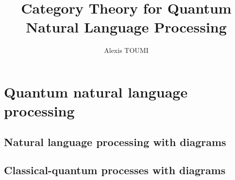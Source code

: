 

\title{Category Theory for Quantum\\
Natural Language Processing}
\author{Alexis TOUMI}

\degreedate{\today}




%
% 
%
%
%
%
% 
% 
% 
% 
%
%
% 
% 
% 
% 








\chapter{Quantum natural language processing} \label{chapter-2:qnlp}

\section{Natural language processing with diagrams}\label{section:NLP}
\section{Classical-quantum processes with diagrams}
